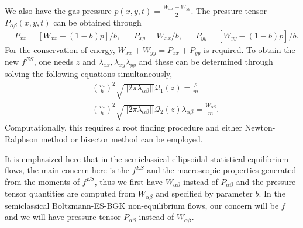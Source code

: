 \documentclass{rsproca}%
\begin{document}
We also have the gas pressure $p(x,y,t) = \frac{W_{xx} + W_{yy}}{2}$.  The pressure tensor $P_{\alpha \beta}(x,y,t)$ can be obtained through
\begin{align}
&P_{xx} = [W_{xx} - (1-b)p]/b,&  &P_{xy} = W_{xx}/b,&  &P_{yy} = [W_{yy} - (1-b)p]/b.&
\label{eq:pressure_tensor_variables}
\end{align}
For the conservation of energy, $W_{xx} +W_{yy} = P_{xx} + P_{yy}$ is required.
To obtain the new $f^{ES}$, one needs $z$ and $\lambda_{xx}, \lambda_{xy}\lambda_{yy}$ and these can be determined through solving the following equations simultaneously,
\begin{subequations}
\begin{align}
&(\frac{m}{h})^2 \sqrt{||2 \pi \lambda_{\alpha \beta} ||}\mathcal{Q}_{1}(z) = \frac{\rho}{m} \\
&(\frac{m}{h})^2 \sqrt{||2 \pi \lambda_{\alpha \beta} ||}\mathcal{Q}_{2}(z) \lambda_{\alpha \beta}= \frac{W_{\alpha \beta}}{m}.
\end{align}
\end{subequations}
Computationally, this requires a root finding procedure and either Newton-Ralphson method or bisector method can be employed.

It is emphasized here that in the semiclassical ellipsoidal statistical equilibrium flows, the main concern here is the $f^{ES}$ and the macroscopic properties generated from the moments of $f^{ES}$, thus we first have $W_{\alpha \beta}$ instead of $P_{\alpha \beta}$ and the pressure tensor quantities are computed from $W_{\alpha \beta}$ and specified by parameter $b$.  In the semiclassical Boltzmann-ES-BGK non-equilibrium flows, our concern will be $f$ and we will have pressure tensor $P_{\alpha \beta}$ instead of $W_{\alpha \beta}$.
\end{document}
